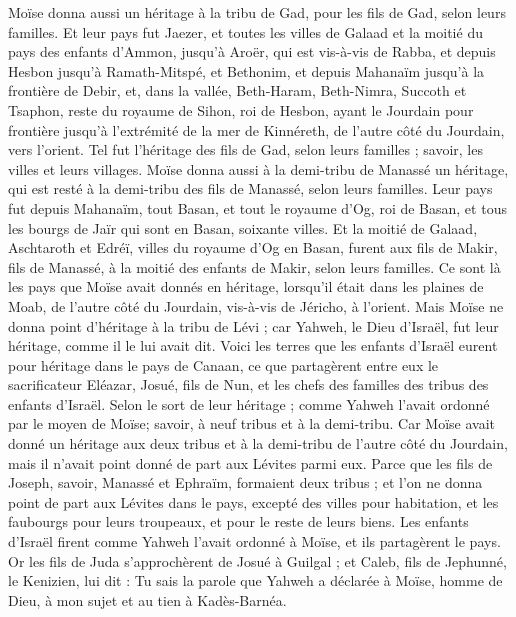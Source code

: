 \begin{multicols}{2}
Moïse donna aussi un héritage à la tribu de Gad, pour les fils de Gad, selon leurs familles.
Et leur pays fut Jaezer, et toutes les villes de Galaad et la moitié du pays des enfants d'Ammon, jusqu'à Aroër, qui est vis-à-vis de Rabba,
et depuis Hesbon jusqu'à Ramath-Mitspé, et Bethonim, et depuis Mahanaïm jusqu'à la frontière de Debir,
et, dans la vallée, Beth-Haram, Beth-Nimra, Succoth et Tsaphon, reste du royaume de Sihon, roi de Hesbon, ayant le Jourdain pour frontière jusqu'à l'extrémité de la mer de Kinnéreth, de l'autre côté du Jourdain, vers l'orient.
Tel fut l'héritage des fils de Gad, selon leurs familles ; savoir, les villes et leurs villages.
Moïse donna aussi à la demi-tribu de Manassé un héritage, qui est resté à la demi-tribu des fils de Manassé, selon leurs familles.
Leur pays fut depuis Mahanaïm, tout Basan, et tout le royaume d'Og, roi de Basan, et tous les bourgs de Jaïr qui sont en Basan, soixante villes.
Et la moitié de Galaad, Aschtaroth et Edréï, villes du royaume d'Og en Basan, furent aux fils de Makir, fils de Manassé, à la moitié des enfants de Makir, selon leurs familles.
Ce sont là les pays que Moïse avait donnés en héritage, lorsqu'il était dans les plaines de Moab, de l'autre côté du Jourdain, vis-à-vis de Jéricho, à l'orient.
Mais Moïse ne donna point d'héritage à la tribu de Lévi ; car Yahweh, le Dieu d'Israël, fut leur héritage, comme il le lui avait dit.
\VerseOne{}Voici les terres que les enfants d'Israël eurent pour héritage dans le pays de Canaan, ce que partagèrent entre eux le sacrificateur Eléazar, Josué, fils de Nun, et les chefs des familles des tribus des enfants d'Israël.
Selon le sort de leur héritage ; comme Yahweh l'avait ordonné par le moyen de Moïse; savoir, à neuf tribus et à la demi-tribu.
Car Moïse avait donné un héritage aux deux tribus et à la demi-tribu de l'autre côté du Jourdain, mais il n'avait point donné de part aux Lévites parmi eux.
Parce que les fils de Joseph, savoir, Manassé et Ephraïm, formaient deux tribus ; et l'on ne donna point de part aux Lévites dans le pays, excepté des villes pour habitation, et les faubourgs pour leurs troupeaux, et pour le reste de leurs biens.
Les enfants d'Israël firent comme Yahweh l'avait ordonné à Moïse, et ils partagèrent le pays.
Or les fils de Juda s'approchèrent de Josué à Guilgal ; et Caleb, fils de Jephunné, le Kenizien, lui dit : Tu sais la parole que Yahweh a déclarée à Moïse, homme de Dieu, à mon sujet et au tien à Kadès-Barnéa.

\end{multicols}
